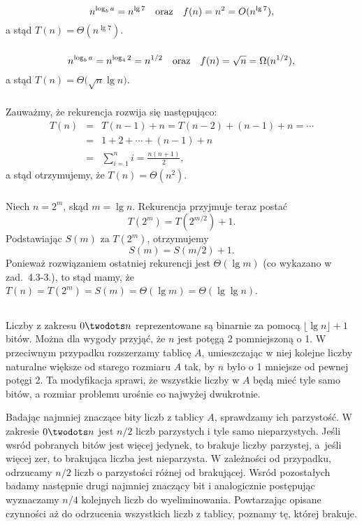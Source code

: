 \subsubsection{} %
\[
	n^{\log_ba} = n^{\lg7} \quad\hbox{oraz}\quad f(n) = n^2 = O(n^{\lg7}),
\]
a stąd $T(n)=\Theta(n^{\lg 7})$.

\subsubsection{} %
\[
	n^{\log_ba} = n^{\log_42} = n^{1/2} \quad\hbox{oraz}\quad f(n) = \sqrt{n} = \Omega(n^{1/2}),
\]
a stąd $T(n)=\Theta\bigl(\sqrt{n}\lg n\bigr)$.

\subsubsection{} %
Zauważmy, że rekurencja rozwija się następująco:
\begin{eqnarray*}
	T(n) &=& T(n-1)+n=T(n-2)+(n-1)+n=\cdots \\
	&=& 1+2+\cdots+(n-1)+n \\
	&=& \sum_{i=1}^ni = \frac{n(n+1)}{2},
\end{eqnarray*}
a stąd otrzymujemy, że $T(n)=\Theta(n^2)$.

\subsubsection{} %
Niech $n=2^m$, skąd $m=\lg n$. Rekurencja przyjmuje teraz postać
\[
	T(2^m) = T(2^{m/2})+1.
\]
Podstawiając $S(m)$ za $T(2^m)$, otrzymujemy
\[
	S(m) = S(m/2)+1.
\]
Ponieważ rozwiązaniem ostatniej rekurencji jest $\Theta(\lg m)$ (co wykazano w zad.~4.3-3.), to stąd mamy, że $T(n)=T(2^m)=S(m)=\Theta(\lg m)=\Theta(\lg\lg n)$.

\subsection{} %
Liczby z zakresu $0\twodots n$ reprezentowane są binarnie za pomocą $\lfloor\lg n\rfloor+1$ bitów. Można dla wygody przyjąć, że $n$ jest potęgą 2 pomniejszoną o 1. W przeciwnym przypadku rozszerzamy tablicę $A$, umieszczając w niej kolejne liczby naturalne większe od starego rozmiaru $A$ tak, by $n$ było o 1 mniejsze od pewnej potęgi 2. Ta modyfikacja sprawi, że wszystkie liczby w $A$ będą mieć tyle samo bitów, a rozmiar problemu urośnie co najwyżej dwukrotnie.

Badając najmniej znaczące bity liczb z tablicy $A$, sprawdzamy ich parzystość. W zakresie $0\twodots n$ jest $n/2$ liczb parzystych i tyle samo nieparzystych. Jeśli wsród pobranych bitów jest więcej jedynek, to brakuje liczby parzystej, a~jeśli więcej zer, to brakująca liczba jest nieparzysta. W zależności od przypadku, odrzucamy $n/2$ liczb o parzystości różnej od brakującej. Wsród pozostałych badamy następnie drugi najmniej znaczący bit i analogicznie postępując wyznaczamy $n/4$ kolejnych liczb do wyeliminowania. Powtarzając opisane czynności aż do odrzucenia wszystkich liczb z tablicy, poznamy tę, której brakuje.

